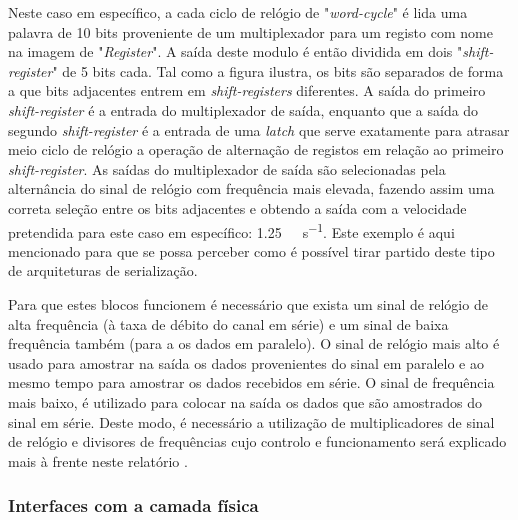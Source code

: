 Neste caso em específico, a cada ciclo de relógio de "\textit{word-cycle}" é lida uma palavra de 10 bits proveniente de um multiplexador para um registo com nome na imagem de "\textit{Register}". A saída deste modulo é então dividida em dois "\textit{shift-register}"  de 5 bits cada. Tal como a figura ilustra, os bits são separados de forma a que bits adjacentes entrem em \textit{shift-registers} diferentes. A saída do primeiro \textit{shift-register} é a entrada do multiplexador de saída, enquanto que a saída do segundo \textit{shift-register} é a entrada de uma \textit{latch} que serve exatamente para atrasar meio ciclo de relógio a operação de alternação de registos em relação ao primeiro \textit{shift-register}. As saídas do multiplexador de saída são selecionadas pela alternância do sinal de relógio com frequência mais elevada, fazendo assim uma correta seleção entre os bits adjacentes e obtendo a saída com a velocidade pretendida para este caso em específico: \SI{1.25}{\giga\bit\per\second}. Este exemplo é aqui mencionado para que se possa perceber como é possível tirar partido deste tipo de arquiteturas de serialização.
%


Para que estes blocos funcionem é necessário que exista um sinal de relógio de alta frequência (à taxa de débito do canal em série) e um sinal de baixa frequência também (para a os dados em paralelo). O sinal de relógio mais alto é usado para amostrar na saída os dados provenientes do sinal em paralelo e ao mesmo tempo para amostrar os dados recebidos em série. O sinal de frequência mais baixo, é utilizado para colocar na saída os dados que são amostrados do sinal em série. Deste modo, é necessário a utilização de multiplicadores de sinal de relógio e divisores de frequências cujo controlo e funcionamento será explicado mais à frente neste relatório .


\subsubsection*{Interfaces com a camada física} \label{subsub:pre_enfase_equalizacao}

